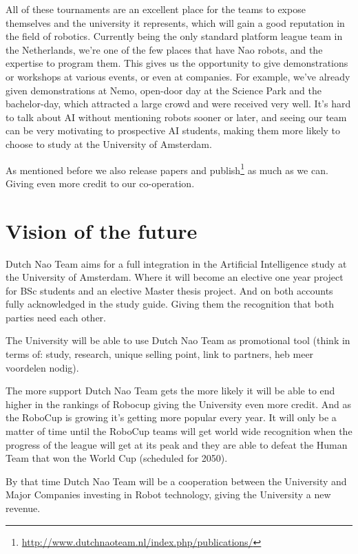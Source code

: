 \documentclass[11pt]{article}
\begin{document}
All of these tournaments are an excellent place for the teams to expose themselves and the university it represents, which will gain a good reputation in the field of robotics. Currently being the only standard platform league team in the Netherlands, we’re one of the few places that have Nao robots, and the expertise to program them. This gives us the opportunity to give demonstrations or workshops at various events, or even at companies. For example, we’ve already given demonstrations at Nemo, open-door day at the Science Park and the bachelor-day, which attracted a large crowd and were received very well. It’s hard to talk about AI without mentioning robots sooner or later, and seeing our team can be very motivating to prospective AI students, making them more likely to choose to study at the University of Amsterdam.

As mentioned before we also release papers and publish\footnote{\url{http://www.dutchnaoteam.nl/index.php/publications/}} as much as we can. Giving even more credit to our co-operation.

\section{Vision of the future}
Dutch Nao Team aims for a full integration in the Artificial Intelligence study at the University of Amsterdam. Where it will become an elective one year project for BSc students and an elective Master thesis project. And on both accounts fully acknowledged in the study guide. Giving them the recognition that both parties need each other.

The University will be able to use Dutch Nao Team as promotional tool (think in terms of: study, research, unique selling point, link to partners, heb meer voordelen nodig). 

The more support Dutch Nao Team gets the more likely it will be able to end higher in the rankings of Robocup giving the University even more credit. And as the RoboCup is growing it’s getting more popular every year. It will only be a matter of time until the RoboCup teams will get world wide recognition when the progress of the league will get at its peak and they are able to defeat the Human Team that won the World Cup (scheduled for 2050). 

By that time Dutch Nao Team will be a cooperation between the University and Major Companies investing in Robot technology, giving the University a new revenue.
\end{document}
